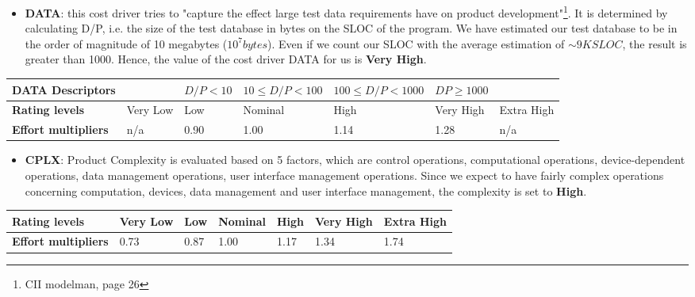 		
		\begin{itemize}
			\item \textbf{DATA}: this cost driver tries to "capture the effect large test data requirements have on
product development"\footnote{CII modelman, page 26}. It is determined by calculating D/P, i.e. the size of the test database in bytes on the SLOC of the program. We have estimated our test database to be in the order of magnitude of 10 megabytes ($10^7 bytes$). Even if we count our SLOC with the average estimation of $\sim 9K SLOC$, the result is greater than 1000. Hence, the value of the cost driver DATA for us is \textbf{Very High}.
		\end{itemize}
		
		\begin{center}
			\begin{tabular}{ | C{2cm} | C{2cm} | C{2cm} | C{2cm} | C{2cm} | C{2cm} | C{2cm} | }
				\hline
				\textbf{DATA Descriptors} & & $D/P < 10 $ & $ 10 \leq D/P < 100$ & $ 100 \leq D/P < 1000$ & $DP \geq 1000$ & \\ \hline
			
				\textbf{Rating levels} & Very Low & Low & Nominal & High & Very High & Extra High\\ \hline
			
				\textbf{Effort multipliers} & n/a & 0.90 & 1.00 & 1.14 & 1.28 & n/a\\ \hline
			\end{tabular}
		\end{center}
		
		
		
		
		\begin{itemize}
			\item \textbf{CPLX}: Product Complexity is evaluated based on 5 factors, which are control operations, computational operations, device-dependent operations, data management operations, user interface management operations. Since we expect to have fairly complex operations concerning computation, devices, data management and user interface management, the complexity is set to \textbf{High}.
		\end{itemize}
		
		\begin{center}
			\begin{tabular}{ | C{2cm} | C{2cm} | C{2cm} | C{2cm} | C{2cm} | C{2cm} | C{2cm} | }
				\hline
				\textbf{Rating levels} & Very Low & Low & Nominal & High & Very High & Extra High\\ \hline
			
				\textbf{Effort multipliers} & 0.73 & 0.87 & 1.00 & 1.17 & 1.34 & 1.74\\ \hline
			\end{tabular}
		\end{center}
		
